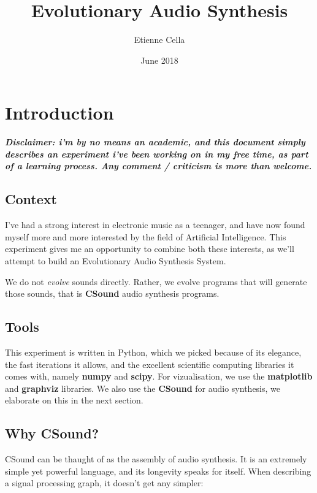\documentclass{article}
\title{Evolutionary Audio Synthesis}
\author{Etienne Cella }
\date{June 2018}
\begin{document}
\maketitle

\tableofcontents

\section{Introduction}

\textbf{\textit{Disclaimer: i'm by no means an academic, and this document simply describes an experiment i've been working on in my free time, as part of a learning process. Any comment / criticism is more than welcome.}}\par

\subsection{Context}
I've had a strong interest in electronic music as a teenager, and have now found myself more and more interested by the field of Artificial Intelligence. This experiment gives me an opportunity to combine both these interests, as we'll attempt to build an Evolutionary Audio Synthesis System.\par
We do not \textit{evolve} sounds directly. Rather, we evolve programs that will generate those sounds, that is \textbf{CSound} audio synthesis programs.

\subsection{Tools}

This experiment is written in Python, which we picked because of its elegance, the fast iterations it allows, and the excellent scientific computing libraries it comes with, namely \textbf{numpy} and \textbf{scipy}. For vizualisation, we use the \textbf{matplotlib} and \textbf{graphviz} libraries. We also use the \textbf{CSound} for audio synthesis, we elaborate on this in the next section.

\subsection{Why CSound?}\label{whycsound}
CSound can be thaught of as the assembly of audio synthesis. It is an extremely simple yet powerful language, and its longevity speaks for itself. When describing a signal processing graph, it doesn't get any simpler:
\end{document}

